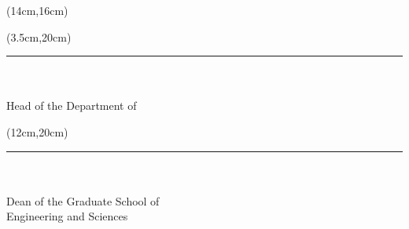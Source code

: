 \begin{spacing}{1}
	
	\begin{textblock*}{\textwidth}(14cm,16cm)
		\textbf{\ApprovalPageDate}
	\end{textblock*}

	\begin{textblock*}{\textwidth}(3.5cm,20cm)
		\noindent\rule{5cm}{0.1mm}\\
		\textbf{\HeadOfTheDepartmentTitle{ }\HeadOfTheDepartmentName{}
		\MakeUppercase\HeadOfTheDepartmentSurname}\\
		Head of the Department of\\
		\HeadOfTheDepartmentDepartment
	\end{textblock*}

	\begin{textblock*}{\textwidth}(12cm,20cm)
		\noindent\rule{5cm}{0.1mm}\\
		\textbf{\HeadOfTheGraduateSchoolTitle{ }\HeadOfTheGraduateSchoolName{}
		\MakeUppercase\HeadOfTheGraduateSchoolSurname}\\
		Dean of the Graduate School of\\
		Engineering and Sciences
	\end{textblock*}
\end{spacing}
~\pagebreak
